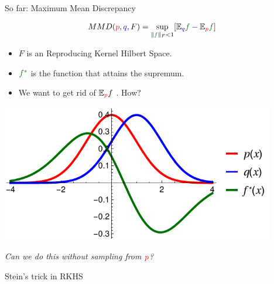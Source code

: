 \begin{frame}
\begin{columns}
\begin{column}{.33\linewidth}
\begin{block}{So far: Maximum Mean Discrepancy}
\begin{minipage}{.60\linewidth}
\vspace{1cm}
\large
\begin{align*}
MMD({\color{red} p},{ \color{blue} q},F) = \sup_{   \| {\color{mg}f} \|_F<1} [\ev_{{ \color{blue} q}}{\color{mg}f}- \ev_{{\color{red} p}}{\color{mg} f}]   
\end{align*}
\normalsize
\vspace{1cm}
 \begin{itemize}
  \item $F$ is an Reproducing Kernel Hilbert Space.
  \item ${\color{mg} f^*}$ is the function that attains the supremum.
  \item We want to get rid of  $\mathbb{E}_{ {\color{red} p} }f$ . How?
 \end{itemize}

\end{minipage}
\begin{minipage}{.35\linewidth}

\begin{center}
\vspace{-1cm}
\hspace{-2.5cm}
\includegraphics[width=12cm,height=6cm]{../../presentation/img/mmd.pdf}
\end{center}
\end{minipage}
\vspace{1cm}
\begin{center}
\emph{Can we do this without sampling from ${ \color{red} p}$?}
\end{center}
\end{block}
\vspace{-0.75cm}
\begin{block}{Stein's trick in RKHS}


\end{block}
\end{column}
\end{columns}
\end{frame}
